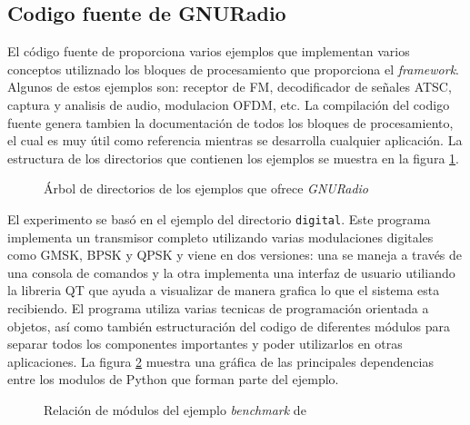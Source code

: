 \subsection{Codigo fuente de GNURadio}
El c\'odigo fuente de \gnuradio proporciona varios ejemplos que implementan varios conceptos
utiliznado los bloques de procesamiento que proporciona el \emph{framework}. Algunos de estos
ejemplos son: receptor de FM, decodificador de se\~nales ATSC, captura y analisis de audio,
modulacion OFDM, etc. La compilaci\'on del codigo fuente genera tambien la documentaci\'on de todos
los bloques de procesamiento, el cual es muy \'util como referencia mientras se desarrolla cualquier
aplicaci\'on. La estructura de los directorios que contienen los ejemplos se muestra en la figura
\ref{fig:extree}.

\begin{figure}[ht]
\DTsetlength{1.5em}{1em}{0.2em}{0.4pt}{1.6pt} %
	\vspace{0.5in}
	\caption{\'Arbol de directorios de los ejemplos que ofrece \emph{GNURadio}}
	\label{fig:extree}
\end{figure}

El experimento se bas\'o en el ejemplo del directorio \verb|digital|. Este programa implementa un
transmisor completo utilizando varias modulaciones digitales como GMSK, BPSK y QPSK y viene en dos
versiones: una se maneja a trav\'es de una consola de comandos y la otra implementa una interfaz de
usuario utiliando la libreria QT que ayuda a visualizar de manera grafica lo que el sistema esta
recibiendo. El programa utiliza varias tecnicas de programaci\'on orientada a objetos, as\'i como
tambi\'en estructuraci\'on del codigo de diferentes m\'odulos para separar todos los componentes
importantes y poder utilizarlos en otras aplicaciones. La figura \ref{fig:relbench} muestra una gr\'afica
de las principales dependencias entre los modulos de Python que forman parte del ejemplo.

\begin{figure}[htp]
\centering
{}
\vspace{0.5in}
\caption{Relaci\'on de m\'odulos del ejemplo \emph{benchmark} de \gnuradio}
\label{fig:relbench}
\end{figure}

